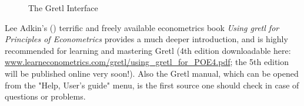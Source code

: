 \documentclass[11pt]{article}
\begin{document}
\begin{figure}[h!]
	\centering
	\caption{The Gretl Interface}
	
	
	\label{fig:GUI}
\end{figure}


Lee Adkin's (\citeyear{Adkins2014}) terrific and freely available econometrics book \emph{Using gretl for Principles of Econometrics} provides a much deeper introduction, and is highly recommended for learning and mastering Gretl (4th edition downloadable here: \\ \url{www.learneconometrics.com/gretl/using_gretl_for_POE4.pdf}; the 5th edition will be published online very soon!). Also the Gretl manual, which can be opened from the "Help, User's guide" menu, is the first source one should check in case of questions or problems.
\end{document}

